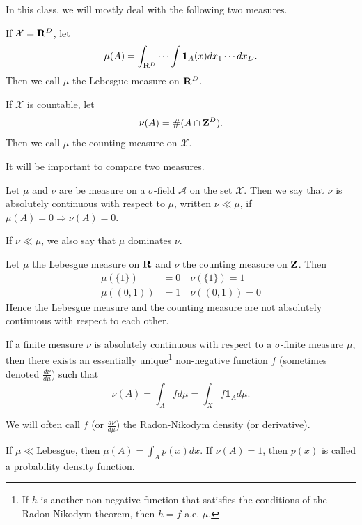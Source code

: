 \documentclass[twoside]{article}
\begin{document}
In this class, we will mostly deal with the following two measures.
\begin{example} 
 If $\mathcal X = \mathbf{R}^D$, let
    \[ \mu(A) = \int_{\mathbf{R}^D} \cdots \int \mathbf{1}_A(x) dx_1 \cdots dx_D. \]
  Then we call $\mu$ the Lebesgue measure on $\mathbf{R}^D$.
\end{example}
\begin{example} 
  If $\mathcal X$ is countable, let
    \[ \nu(A) = \#(A \cap \mathbf{Z}^D). \]
  Then we call $\mu$ the counting measure on $\mathcal X$.
\end{example}

It will be important to compare two measures.

\begin{definition}\label{def:absolutecontinuity}\citep[Def. 1.9, p.~7]{keener}
  Let $\mu$ and $\nu$ are be measure on a $\sigma$-field $\mathcal A$ on the
  set $\mathcal X$. Then we say that $\nu$ is absolutely continuous with respect
  to $\mu$, written $\nu \ll \mu$, if $\mu(A) = 0 \Rightarrow \nu(A) = 0$.
\end{definition}
If $\nu \ll \mu$, we also say that $\mu$ dominates $\nu$.

\begin{example}  Let $\mu$ the Lebesgue measure on $\mathbf{R}$ and $\nu$ the counting
  measure on $\mathbf{Z}$.  Then
  \begin{align*}
    \mu(\{1\}) &= 0 \quad \nu(\{1\}) = 1 \\
    \mu((0, 1)) &= 1 \quad \nu((0, 1)) = 0
  \end{align*}
  Hence the Lebesgue measure and the counting measure are not absolutely continuous
  with respect to each other.
\end{example}

\begin{theorem}\citep[Def. 1.10, p.~7]{keener}
  If a finite measure $\nu$ is absolutely continuous with respect to a
  $\sigma$-finite measure $\mu$, then there exists an essentially unique\footnote{If $h$ is
  another non-negative function that satisfies the conditions of the Radon-Nikodym theorem,
  then $h=f$ a.e. $\mu$.} non-negative function $f$
  (sometimes denoted $\frac{d\nu}{d\mu}$) such that
  \[\nu(A) = \int_A f d\mu = \int_X f \mathbf{1}_A d\mu.\]
\end{theorem}

We will often call $f$ (or $\frac{d\nu}{d\mu}$) the Radon-Nikodym density (or derivative).

\begin{example}
  If $\mu \ll \text{Lebesgue}$, then $\mu(A) = \int_A p(x) dx$.  If $\nu(A) =
  1$, then $p(x)$ is called a probability density function.
\end{example}
\end{document}
